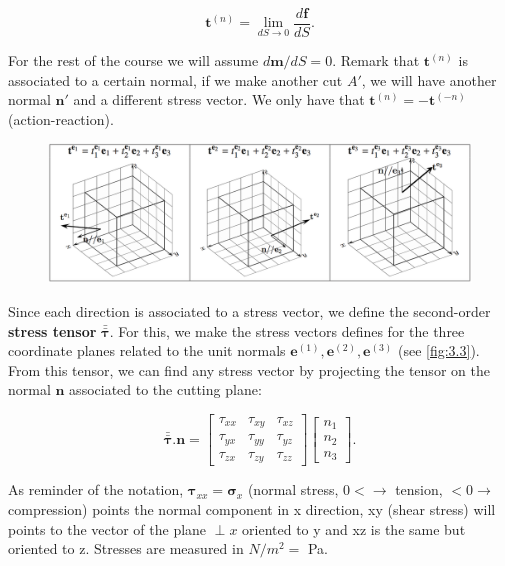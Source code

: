 		\begin{equation}
		\mathbf{t}^{(n)} = \lim _{dS\rightarrow 0} \frac{d\mathbf{f}}{dS}. 
		\end{equation}
		
		For the rest of the course we will assume $d\mathbf{m}/dS = 0$. Remark that $\mathbf{t}^{(n)}$ is associated to a certain normal, if we make another cut $A'$, we will have another normal $\bm{n}'$ and a different stress vector. We only have that $\mathbf{t}^{(n)} = -\mathbf{t}^{(-n)}$ (action-reaction). \\
		
		\begin{figure}
		\vspace{-5mm}	
		\includegraphics[scale=0.3]{ch3/3}
		\label{fig:3.3}
		\end{figure}		
		Since each direction is associated to a stress vector, we define the second-order \textbf{stress tensor} $\bm{\bar{\bar{\tau}}}$. For this, we make the stress vectors defines for the three coordinate planes related to the unit normals $\bm{e}^{(1)}, \bm{e}^{(2)}, \bm{e}^{(3)}$ (see \autoref{fig:3.3}). From this tensor, we can find any stress vector by projecting the tensor on the normal $\bm{n}$ associated to the cutting plane:
		
		\begin{equation}
			\bm{\bar{\bar{\tau}}. n} = 
			\left[
			\begin{array}{ccc}
			\tau _{xx} & \tau _{xy} & \tau _{xz}\\
			\tau _{yx} & \tau _{yy} & \tau _{yz}\\
			\tau _{zx} & \tau _{zy} & \tau _{zz}
			\end{array}
			\right]
			\left[
			\begin{array}{c}
			n_1\\
			n_2\\
			n_3
			\end{array}
			\right].
		\end{equation}
		
		As reminder of the notation, $\bm{\tau} _{xx} = \bm{\sigma} _x$ (normal stress, $0<\rightarrow$ tension, $<0 \rightarrow$ compression) points the normal component in x direction, xy (shear stress) will points to the vector of the plane $\perp x$ oriented to y and xz is the same but oriented to z. Stresses are measured in $N/m^2 =$ Pa.\\
		
